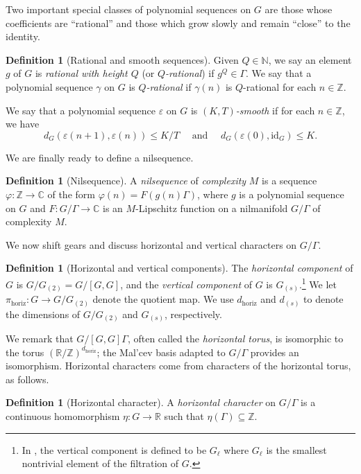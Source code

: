 \documentclass[11pt]{amsart}
\theoremstyle{definition}
\newtheorem{definition}[lemma]{Definition}
\newcommand{\C}{{\mathbb C}}
\newcommand{\N}{{\mathbb N}}
\newcommand{\R}{{\mathbb R}}
\newcommand{\Z}{{\mathbb Z}}
\newcommand{\eps}{\varepsilon}
\begin{document}
Two important special classes of polynomial sequences on $G$ are those whose coefficients are ``rational'' and those which grow slowly and remain ``close'' to the identity.

\begin{definition}[Rational and smooth sequences] Given $Q\in\N$, we say an element $g$ of $G$ is \emph{rational with height $Q$} (or \emph{$Q$-rational}) if $g^Q \in \Gamma$. We say that a polynomial sequence $\gamma$ on $G$ is \emph{$Q$-rational} if $\gamma({n})$ is $Q$-rational for each ${n} \in\mathbb{Z}$.

We say that a polynomial sequence $\eps$ on $G$ is \emph{$(K, {T})$-smooth} if for each $n\in\Z$, we have
$$d_{G}(\eps(n +1), \eps(n)) \le K/T \quad \text{ and }\quad d_{G}(\eps(0), \mathrm{id}_G) \le K.$$
\end{definition}


We are finally ready to define a nilsequence.
\begin{definition}[Nilsequence]\label{D: nilsequence}
A \emph{nilsequence} of \textit{complexity} $M$ is a sequence $\varphi: \Z\to\C$ of the form $\varphi(n) = F(g(n)\Gamma)$, where $g$ is a polynomial sequence on $G$ and $F\colon G/\Gamma \to \mathbb{C}$ is an $M$-Lipschitz function on a nilmanifold $G/\Gamma$ of complexity $M$.
\end{definition}


We now shift gears and discuss horizontal and vertical characters on $G/\Gamma$.

\begin{definition}[Horizontal and vertical components]
The \emph{horizontal component} of $G$ is $G/G_{(2)} = G/[G, G]$, and the \emph{vertical component} of $G$ is $G_{(s)}$.\footnote{In \cite{GT12}, the vertical component is defined to be $G_\ell$ where $G_\ell$ is the smallest nontrivial element of the filtration of $G$.} We let $\pi_{\mathrm{horiz}}\colon G \to G/G_{(2)}$ denote the quotient map. We use  $d_{\mathrm{horiz}}$ and $d_{(s)}$ to denote the dimensions of $G/G_{(2)}$ and $G_{(s)}$, respectively.
\end{definition}


We remark that $G/[G, G]\Gamma$, often called the \emph{horizontal torus}, is isomorphic to the torus $(\R/\Z)^{d_{\mathrm{horiz}}}$; the Mal'cev basis adapted to $G/\Gamma$ provides an isomorphism.  Horizontal characters come from characters of the horizontal torus, as follows.

\begin{definition}[Horizontal character]
A \emph{horizontal character} on $G/\Gamma$ is a continuous homomorphism $\eta\colon G \to \mathbb{R}$ such that $\eta(\Gamma) \subseteq \mathbb{Z}$.
\end{definition}
\end{document}
